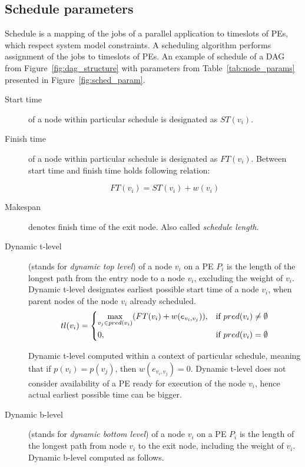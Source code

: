 \subsection{Schedule parameters}
\label{sec:sched_params}

Schedule is a mapping of the jobs of a parallel application to
timeslots of PEs, which respect system model constraints. A scheduling
algorithm performs assignment of the jobs to timeslots of PEs. An
example of schedule of a DAG from Figure~\ref{fig:dag_structure} with
parameters from Table~\ref{tab:node_params} presented in
Figure~\ref{fig:sched_param}.

\begin{description}

\item[Start time] of a node within particular schedule is designated
  as $ST(v_i)$.
\item[Finish time] of a node within particular schedule is designated
  as $FT(v_i)$. Between start time and finish time holds following
  relation:

\[
FT(v_i) = ST(v_i) + w(v_i)
\]

\item[Makespan] denotes finish time of the exit node. Also called
  \emph{schedule length}.

\item[Dynamic t-level] (stands for \emph{dynamic top level}) of a node
  $v_i$ on a PE $P_i$ is the length of the longest path from the entry
  node to a node $v_i$, excluding the weight of $v_i$. Dynamic t-level
  designates earliest possible start time of a node $v_i$, when parent
  nodes of the node $v_i$ already scheduled.
\[
tl(v_i) =
  \begin{dcases}
    \max_{v_j \in pred(v_i)}(FT(v_i) + w(e_{v_i,v_j})),& \text{if } pred(v_i) \neq \emptyset\\
    0, & \text{if } pred(v_i) = \emptyset
  \end{dcases}
\]

Dynamic t-level computed within a context of particular schedule,
meaning that if $p(v_i) = p(v_j)$, then $w(e_{v_i, v_j}) = 0$. Dynamic
t-level does not consider availability of a PE ready for execution of
the node $v_i$, hence actual earliest possible time can be bigger.

\item[Dynamic b-level] (stands for \emph{dynamic bottom level}) of a
  node $v_i$ on a PE $P_i$ is the length of the longest path from node
  $v_i$ to the exit node, including the weight of $v_i$. Dynamic
  b-level computed as follows.


\end{description}
